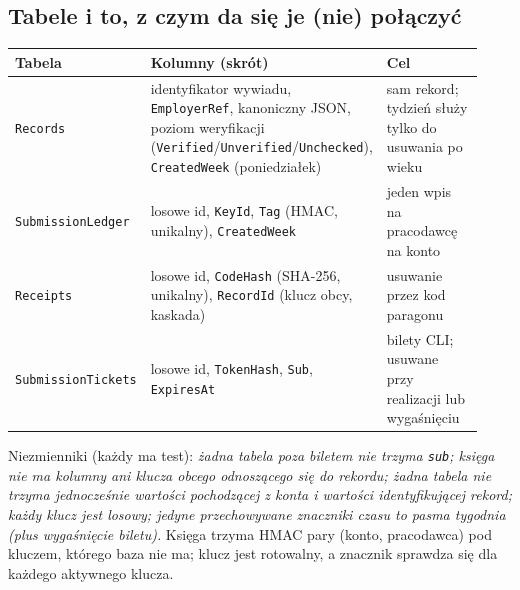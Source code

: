\subsection{Tabele i to, z czym da się je (nie) połączyć}

\begin{longtable}{@{}p{0.2\linewidth}p{0.4\linewidth}p{0.33\linewidth}@{}}
\toprule
Tabela & Kolumny (skrót) & Cel \\
\midrule
\endhead
\texttt{Records} & identyfikator wywiadu, \texttt{EmployerRef}, kanoniczny JSON,
  poziom weryfikacji (\texttt{Verified}/\texttt{Unverified}/\texttt{Unchecked}),
  \texttt{CreatedWeek} (poniedziałek) & sam rekord; tydzień służy tylko do
  usuwania po wieku \\
\texttt{SubmissionLedger} & losowe id, \texttt{KeyId}, \texttt{Tag} (HMAC,
  unikalny), \texttt{CreatedWeek} & jeden wpis na pracodawcę na konto \\
\texttt{Receipts} & losowe id, \texttt{CodeHash} (SHA-256, unikalny),
  \texttt{RecordId} (klucz obcy, kaskada) & usuwanie przez kod paragonu \\
\texttt{SubmissionTickets} & losowe id, \texttt{TokenHash}, \texttt{Sub},
  \texttt{ExpiresAt} & bilety CLI; usuwane przy realizacji lub wygaśnięciu \\
\bottomrule
\end{longtable}

Niezmienniki (każdy ma test): \emph{żadna tabela poza biletem nie trzyma
\texttt{sub}; księga nie ma kolumny ani klucza obcego odnoszącego się do
rekordu; żadna tabela nie trzyma jednocześnie wartości pochodzącej z konta
i wartości identyfikującej rekord; każdy klucz jest losowy; jedyne
przechowywane znaczniki czasu to pasma tygodnia (plus wygaśnięcie biletu).}
Księga trzyma HMAC pary (konto, pracodawca) pod kluczem, którego baza nie ma;
klucz jest rotowalny, a znacznik sprawdza się dla każdego aktywnego klucza.


